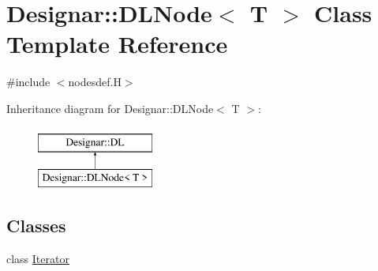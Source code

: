 \hypertarget{class_designar_1_1_d_l_node}{}\section{Designar\+:\+:D\+L\+Node$<$ T $>$ Class Template Reference}
\label{class_designar_1_1_d_l_node}


{\ttfamily \#include $<$nodesdef.\+H$>$}

Inheritance diagram for Designar\+:\+:D\+L\+Node$<$ T $>$\+:\begin{figure}[H]
\begin{center}
\leavevmode
\includegraphics[height=2.000000cm]{class_designar_1_1_d_l_node}
\end{center}
\end{figure}
\subsection*{Classes}
\begin{DoxyCompactItemize}
\item 
class \hyperlink{class_designar_1_1_d_l_node_1_1_iterator}{Iterator}
\end{DoxyCompactItemize}
